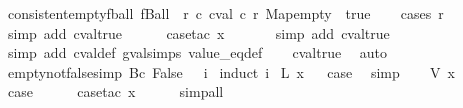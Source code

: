 \begin{isabellebody}
\ consistent{\isacharunderscore}empty{\isacharunderscore}fball{\isacharcolon}\ {\isachardoublequoteopen}fBall\ {\isacharparenleft}{\isasymlbrakk}{\isasymrbrakk}\ r{\isacharparenright}\ {\isacharparenleft}{\isasymlambda}c{\isachardot}\ cval\ c\ r\ Map{\isachardot}empty\ {\isacharequal}\ true{\isacharparenright}{\isachardoublequoteclose}\isanewline
%
\isadelimproof
\ \ %
\endisadelimproof
%
\isatagproof
{}\isamarkupfalse%
\ {\isacharparenleft}cases\ r{\isacharparenright}\isanewline
\ \ \ \ \ \isamarkupfalse%
\ {\isacharparenleft}simp\ add{\isacharcolon}\ cval{\isacharunderscore}true{\isacharparenright}\isanewline
\ \ \ \ \isamarkupfalse%
\ {\isacharparenleft}case{\isacharunderscore}tac\ x{}{\isacharparenright}\isanewline
\ \ \ \ \ \isamarkupfalse%
\ {\isacharparenleft}simp\ add{\isacharcolon}\ cval{\isacharunderscore}true{\isacharparenright}\isanewline
\ \ \ \ \isamarkupfalse%
\ {\isacharparenleft}simp\ add{\isacharcolon}\ cval{\isacharunderscore}def\ gval{\isachardot}simps\ value_eq{\isacharunderscore}def{\isacharparenright}\isanewline
\ \ \isamarkupfalse%
\ cval{\isacharunderscore}true\ \isamarkupfalse%
\ auto%
\endisatagproof
{\isafoldproof}%
%
\isadelimproof
\isanewline
%
\endisadelimproof
\isanewline
{}\isamarkupfalse%
\ empty{\isacharunderscore}not{\isacharunderscore}false{\isacharbrackleft}simp{\isacharbrackright}{\isacharcolon}\ {\isachardoublequoteopen}{\isacharbraceleft}{\isacharbar}Bc\ False{\isacharbar}{\isacharbraceright}\ {\isasymnoteq}\ {\isasymlbrakk}{\isasymrbrakk}\ i{\isachardoublequoteclose}\isanewline
%
\isadelimproof
%
\endisadelimproof
%
\isatagproof
{}\isamarkupfalse%
\ {\isacharparenleft}induct\ i{\isacharparenright}\isanewline
{}\isamarkupfalse%
\ {\isacharparenleft}L\ x{\isacharparenright}\isanewline
{}\isamarkupfalse%
\ \isamarkupfalse%
\ {\isacharquery}case\ \isamarkupfalse%
\ simp\isanewline
{}\isamarkupfalse%
\isanewline
\ \ \isamarkupfalse%
\ {\isacharparenleft}V\ x{\isacharparenright}\isanewline
\ \ \isamarkupfalse%
\ \isamarkupfalse%
\ {\isacharquery}case\isanewline
\ \ \ \ \isamarkupfalse%
\ {\isacharparenleft}case{\isacharunderscore}tac\ x{\isacharparenright}\isanewline
\ \ \ \ \isamarkupfalse%
\ simp{\isacharunderscore}all\isanewline
{}\isamarkupfalse%
\isanewline
\ \ \isamarkupfalse%

\end{isabellebody}
